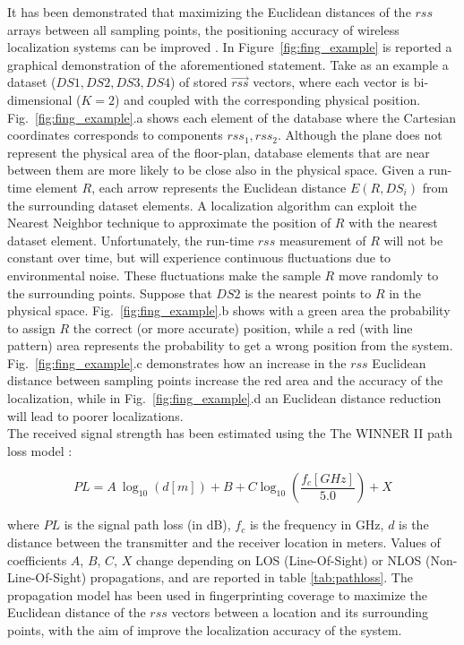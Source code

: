It has been demonstrated that maximizing the Euclidean distances of the $rss$ arrays between all sampling points, the positioning accuracy of wireless localization systems can be improved \cite{Zhao2008, He2011}.
In Figure~\ref{fig:fing_example} is reported a graphical demonstration of the aforementioned statement. Take as an example a dataset ($DS1, DS2, DS3, DS4$) of stored $\vec{rss}$ vectors, where each vector is bi-dimensional ($K=2$) and coupled with the corresponding physical position. Fig.~\ref{fig:fing_example}.a shows each element of the database where the Cartesian coordinates corresponds to components $rss_1, rss_2$. Although the plane does not represent the physical area of the floor-plan, database elements that are near between them are more likely to be close also in the physical space. Given a run-time element $R$, each arrow represents the Euclidean distance $E(R,DS_i)$ from the surrounding dataset elements. A localization algorithm can exploit the Nearest Neighbor technique to approximate the position of $R$ with the nearest dataset element. Unfortunately, the run-time $rss$ measurement of $R$ will not be constant over time, but will experience continuous fluctuations due to environmental noise. These fluctuations make the sample $R$ move randomly to the surrounding points. Suppose that $DS2$ is the nearest points to $R$ in the physical space. Fig.~\ref{fig:fing_example}.b shows with a green area the probability to assign $R$ the correct (or more accurate) position, while a red (with line pattern) area represents the probability to get a wrong position from the system. Fig.~\ref{fig:fing_example}.c demonstrates how an increase in the $rss$ Euclidean distance between sampling points increase the red area and the accuracy of the localization, while in Fig.~\ref{fig:fing_example}.d an Euclidean distance reduction will lead to poorer localizations.\\



The received signal strength has been estimated using the The WINNER II path loss model \cite{Kyosti2008}:

\begin{equation}\label{eq:rss}
PL = A ~ \log_{10} (d[m]) + B + C \log_{10} (\frac{f_c [GHz]}{5.0}) + X
\end{equation}


where \(PL\) is the signal path loss (in dB), \(f_c\) is the frequency in GHz, \(d\) is the distance between the transmitter and the receiver location in meters. Values of coefficients $A$, $B$, $C$, $X$ change depending on LOS (Line-Of-Sight) or NLOS (Non-Line-Of-Sight) propagations, and are reported in table \ref{tab:pathloss}. The propagation model has been used in fingerprinting coverage to maximize the Euclidean distance of the $rss$ vectors between a location and its surrounding points, with the aim of improve the localization accuracy of the system.

